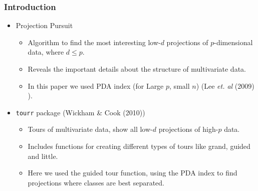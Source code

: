 \documentclass{beamer}
\begin{document}
\begin{frame}
\frametitle{Introduction}
\begin{itemize}
\item Projection Pursuit 
			\begin{itemize}
			\item Algorithm to find the most interesting low-$d$ projections of $p$-dimensional data,  where $d \le p$.
			\item Reveals the important details about the structure of multivariate data.
			\item In this paper we used PDA index (for Large $p$, small $n$) (Lee {\em et. al} (2009) ).
			\end{itemize}		
\item \texttt{tourr} package (Wickham \& Cook (2010)) 
			\begin{itemize}
			\item Tours of multivariate data, show all low-$d$ projections of high-$p$ data.  
			\item Includes functions for creating different types of tours like grand, guided and little.
			\item Here we used the guided tour function, using the PDA index to find projections where classes are best separated.
			\end{itemize}
\end{itemize}
\end{frame}
\end{document}
